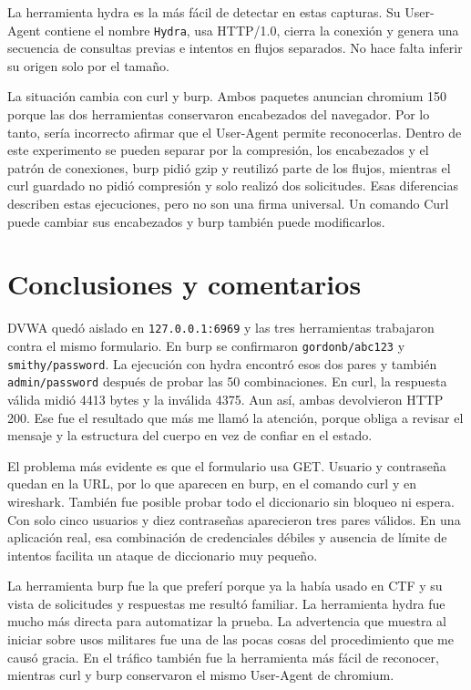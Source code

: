 \documentclass[letterpaper,12pt]{article}
\begin{document}
La herramienta hydra es la más fácil de detectar en estas capturas. Su User-Agent contiene el
nombre \texttt{Hydra}, usa HTTP/1.0, cierra la conexión y genera una secuencia de consultas
previas e intentos en flujos separados. No hace falta inferir su origen solo por el tamaño.

La situación cambia con curl y burp. Ambos paquetes anuncian chromium 150 porque las dos
herramientas conservaron encabezados del navegador. Por lo tanto, sería incorrecto afirmar
que el User-Agent permite reconocerlas. Dentro de este experimento se pueden separar por la
compresión, los encabezados y el patrón de conexiones, burp pidió gzip y reutilizó parte de
los flujos, mientras el curl guardado no pidió compresión y solo realizó dos solicitudes.
Esas diferencias describen estas ejecuciones, pero no son una firma universal. Un comando
Curl puede cambiar sus encabezados y burp también puede modificarlos.

\section*{Conclusiones y comentarios}

DVWA quedó aislado en \texttt{127.0.0.1:6969} y las tres herramientas trabajaron contra
el mismo formulario. En burp se confirmaron \texttt{gordonb/abc123} y
\texttt{smithy/password}. La ejecución con hydra encontró esos dos pares y también
\texttt{admin/password} después de probar las 50 combinaciones. En curl, la respuesta
válida midió 4413 bytes y la inválida 4375. Aun así, ambas devolvieron HTTP 200. Ese fue el
resultado que más me llamó la atención, porque obliga a revisar el mensaje y la estructura
del cuerpo en vez de confiar en el estado.

El problema más evidente es que el formulario usa GET. Usuario y contraseña quedan en la
URL, por lo que aparecen en burp, en el comando curl y en wireshark. También fue posible
probar todo el diccionario sin bloqueo ni espera. Con solo cinco usuarios y diez
contraseñas aparecieron tres pares válidos. En una aplicación real, esa combinación de
credenciales débiles y ausencia de límite de intentos facilita un ataque de diccionario muy
pequeño.

La herramienta burp fue la que preferí porque ya la había usado en CTF y su vista de
solicitudes y respuestas me resultó familiar. La herramienta hydra fue mucho más directa para automatizar
la prueba. La advertencia que muestra al iniciar sobre usos militares fue una de las pocas
cosas del procedimiento que me causó gracia. En el tráfico también fue la herramienta más
fácil de reconocer, mientras curl y burp conservaron el mismo User-Agent de chromium.
\end{document}
